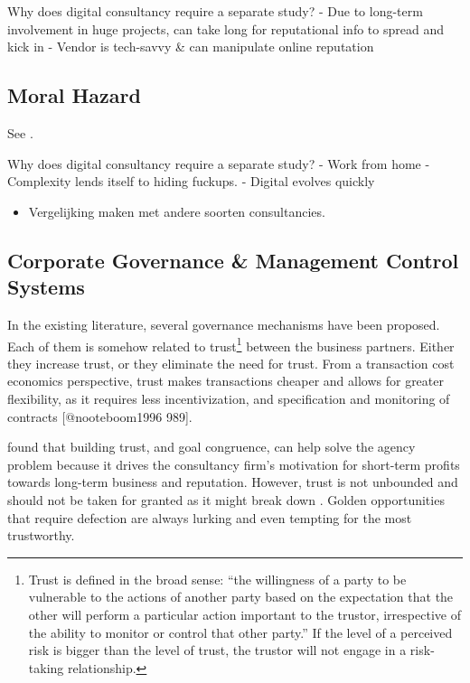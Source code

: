 \documentclass[12pt]{article}
\providecommand{\tightlist}{%
  \setlength{\itemsep}{0pt}\setlength{\parskip}{0pt}}
\begin{document}
Why does digital consultancy require a separate study? - Due to
long-term involvement in huge projects, can take long for reputational
info to spread and kick in - Vendor is tech-savvy \& can manipulate
online reputation

\hypertarget{moral-hazard}{%
\subsection{Moral Hazard}\label{moral-hazard}}

See \citep[ 72-73]{armbruster2006}.

Why does digital consultancy require a separate study? - Work from home
- Complexity lends itself to hiding fuckups. - Digital evolves quickly

\begin{itemize}
\tightlist
\item
  Vergelijking maken met andere soorten consultancies.
\end{itemize}

\hypertarget{corporate-governance-management-control-systems}{%
\subsection{Corporate Governance \& Management Control
Systems}\label{corporate-governance-management-control-systems}}

In the existing literature, several governance mechanisms have been
proposed. Each of them is somehow related to trust\footnote{Trust is
  defined in the broad sense: ``the willingness of a party to be
  vulnerable to the actions of another party based on the expectation
  that the other will perform a particular action important to the
  trustor, irrespective of the ability to monitor or control that other
  party.'' \citep{kee1970} If the level of a perceived risk is bigger
  than the level of trust, the trustor will not engage in a risk-taking
  relationship.} between the business partners. Either they increase
trust, or they eliminate the need for trust. From a transaction cost
economics perspective, trust makes transactions cheaper and allows for
greater flexibility, as it requires less incentivization, and
specification and monitoring of contracts {[}@nooteboom1996 989{]}.

\citet[265]{liberatore2010} found that building trust, and goal
congruence, can help solve the agency problem because it drives the
consultancy firm's motivation for short-term profits towards long-term
business and reputation. However, trust is not unbounded and should not
be taken for granted as it might break down \citep[ 988]{nooteboom1996}.
Golden opportunities that require defection are always lurking and even
tempting for the most trustworthy.
\end{document}
